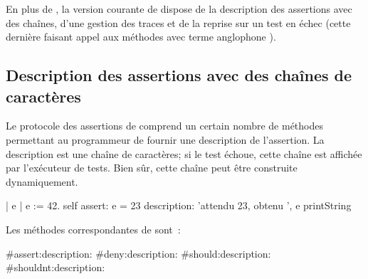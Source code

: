 \documentclass[a4paper,10pt,twoside]{book}
\begin{document}
En plus de , la version courante de \sunit dispose de la description des 
assertions avec des chaînes, d'une gestion des traces et de la reprise sur un test en échec 
(cette dernière faisant appel aux méthodes avec terme anglophone ).  

\subsection{Description des assertions avec des chaînes de caractères} %

Le protocole des assertions de  comprend un certain nombre de méthodes permettant 
au programmeur de fournir une description de l'assertion. La description est une chaîne de 
caractères; si le test échoue, cette chaîne est affichée par l'exécuteur de tests. Bien sûr, 
cette chaîne peut être construite dynamiquement.
\begin{code}{}
| e |
e := 42.
self assert: e = 23
	description: 'attendu 23, obtenu ', e printString
\end{code}

Les méthodes correspondantes  de  sont~:
\begin{code}{}
#assert:description:
#deny:description:
#should:description:
#shouldnt:description:
\end{code}
\end{document}
